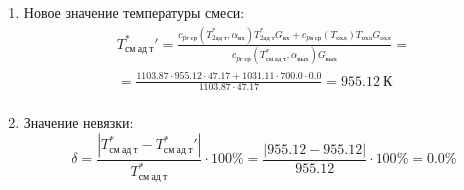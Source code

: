 \documentclass[a4paper,12pt]{article}
\begin{document}
\begin{enumerate}
\begin{enumerate}
            \item Новое значение температуры смеси:
            \begin{gather*}
                T_{см\ ад\ т}^*\prime = \frac{
                        c_{pг\ ср} (T_{2ад\ т}^*, \alpha_{вх}) T_{2ад\ т}^* G_{вх} + c_{pв\ ср} (T_{охл}) T_{охл} G_{охл}
                    }{
                        c_{pг\ ср} (T_{см\ ад\ т}^{*}, \alpha_{вых}) G_{вых}
                    } =\\
                = \frac{
                    1103.87
                    \cdot 955.12 \cdot 47.17 +
                    1031.11
                    \cdot 700.0 \cdot 0.0
                }{
                    1103.87
                    \cdot  47.17
                } =
                955.12\ К\\
            \end{gather*}

            \item Значение невязки:
            \[
                \delta = \frac{ \left| T_{см\ ад\ т}^{*} - T_{см\ ад\ т}^*\prime \right| }{T_{см\ ад\ т}^{*}} \cdot 100 \% =
                    \frac{
                        \left| 955.12 - 955.12 \right|
                    }{
                        955.12
                    } \cdot 100 \% =
                0.0 \%
            \]
        \end{enumerate}

        

    \end{enumerate}
    
\end{document}

